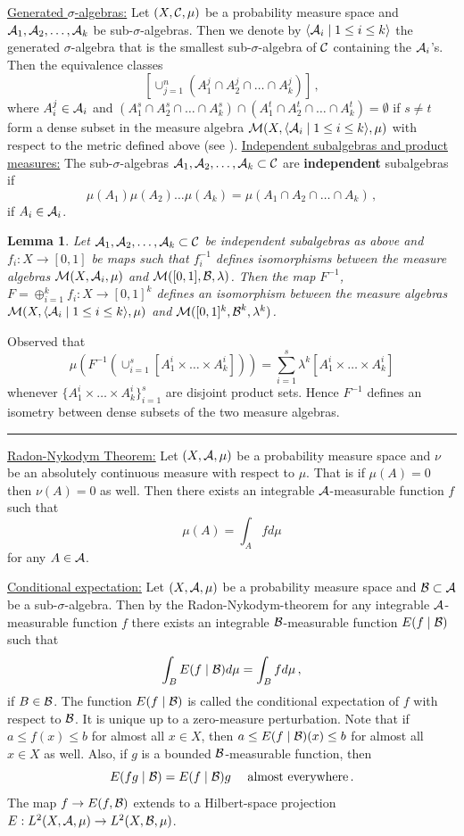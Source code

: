 \documentclass [11pt] {article}
\newcommand{\qed} {\hspace {0.1in} \rule {1.5mm} {3.5mm}}
\newtheorem{lemma}{Lemma}[section]
\def\proof{\smallskip\noindent{\it Proof.} }
\def\cA{\mbox{$\cal A$}}
\def\cB{\mbox{$\cal B$}}
\def\cC{\mbox{$\cal C$}}
\def\cA{\mbox{$\cal A$}}
\def\cB{\mbox{$\cal B$}}
\def\cC{\mbox{$\cal C$}}
\def\cM{\mbox{$\cal M$}}
\def\to{\rightarrow}
\begin{document}
\vskip 0.1in
\noindent
\underline{Generated $\sigma$-algebras:}
Let $(X,\cC,\mu)$ be a probability measure space and $\cA_1,\cA_2,\dots,\cA_k$
be sub-$\sigma$-algebras.
Then we denote by $\langle \cA_i\mid 1\leq i\leq k\rangle$
the generated $\sigma$-algebra that
is the smallest sub-$\sigma$-algebra of $\cC$ containing the $\cA_i$'s.
Then the equivalence classes  $$[\cup^n_{j=1} (A^j_1\cap A^j_2\cap\dots
\cap A^j_k)]\,,$$ where $A^j_i\in\cA_i$ and $(A^s_1\cap A^s_2\cap\dots
\cap A^s_k)\cap (A^t_1\cap A^t_2\cap\dots
\cap A^t_k)=\emptyset $ if $s\neq t$
 form a dense subset in the measure algebra
$\cM(X,\langle \cA_i\mid 1\leq i\leq k \rangle,\mu)$
with respect to the metric defined above
(see \cite{Hal}).
\vskip 0.1in
\noindent
\underline{Independent subalgebras and product measures:}
The sub-$\sigma$-algebras $\cA_1,\cA_2,\dots,\cA_k\subset \cC$ are
{\bf independent} subalgebras if
$$\mu(A_1)\mu(A_2)\dots\mu(A_k)=\mu(A_1\cap A_2\cap\dots\cap A_k)\,,$$
if $A_i\in \cA_i$.
\begin{lemma}
\label{fremlin}
Let $\cA_1,\cA_2,\dots,\cA_k\subset \cC$ be independent subalgebras
as above and $f_i:X\to [0,1]$ be maps such that $f_i^{-1}$ defines
isomorphisms between the measure algebras $\cM(X,\cA_i,\mu)$ and
$\cM([0,1],\cB,\lambda)$. Then the map $F^{-1}$, $F=\oplus_{i=1}^k f_i:X\to
[0,1]^k$ defines an isomorphism between the measure algebras
$\cM(X,\langle \cA_i\mid 1\leq i\leq k \rangle,\mu)$ and
$\cM([0,1]^k,\cB^k,\lambda^k)$.
\end{lemma}
\proof
Observed that
$$\mu (F^{-1}(\cup_{i=1}^s [A^i_1\times\dots\times A^i_k]))=\sum^s_{i=1}
\lambda^k[A^i_1\times\dots\times A^i_k]$$
whenever $\{A^i_1\times\dots\times A^i_k\}^s_{i=1}$ are disjoint product
sets. Hence $F^{-1}$ defines an isometry between dense subsets of the two
measure algebras. \qed

\vskip 0.1in
\noindent
\underline{Radon-Nykodym Theorem:}
Let $(X,\cA,\mu)$ be a probability measure space and $\nu$ be
an absolutely continuous measure with respect to $\mu$. That is
if $\mu(A)=0$ then  $\nu(A)=0$ as well.
Then there exists an integrable $\cA$-measurable function $f$
such that
$$\mu(A)=\int_A f d\mu$$
for any $A\in\cA$.


\vskip 0.1in
\noindent
\underline{Conditional expectation:}
Let $(X,\cA,\mu)$ be a probability measure space
and $\cB\subset\cA$ be a sub-$\sigma$-algebra. Then by the
Radon-Nykodym-theorem for any integrable
$\cA$-measurable function $f$ there exists an integrable
$\cB$-measurable function $E(f\mid\cB)$ such that
$$\int_B E(f\mid\cB) d\mu=\int_B f d\mu\,,$$
if $B\in\cB$. The function $E(f\mid \cB)$ is called the conditional
expectation of $f$ with respect to $\cB$. It is unique up to a
zero-measure perturbation.
Note that if $a\leq f(x)\leq b$ for almost all $x\in X$, then
$a\leq E(f\mid \cB)(x)\leq b$ for almost all $x\in X$ as well.
Also, if $g$ is a bounded $\cB$-measurable function, then
$$E(fg\mid\cB)=E(f\mid \cB) g\,\,\quad\mbox{almost everywhere}\,.$$
The map $f\to E(f,\cB)$ extends to a Hilbert-space projection
$E:L^2(X,\cA,\mu)\to L^2(X,\cB,\mu)$.
\end{document}
